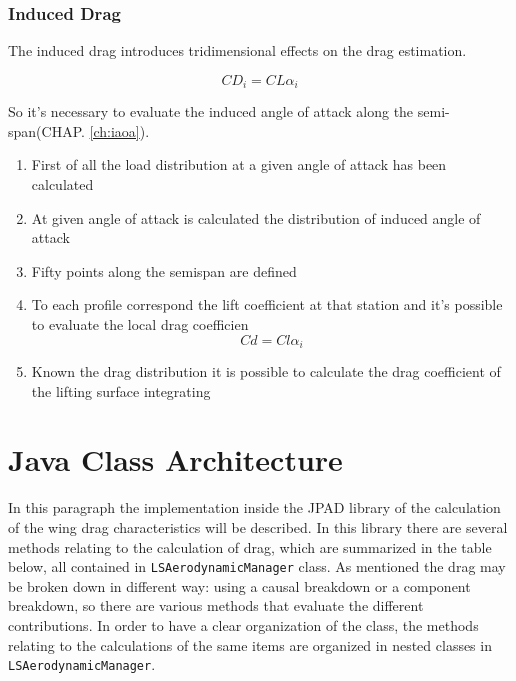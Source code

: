 \subsubsection{Induced Drag}

The induced drag introduces tridimensional effects on the drag estimation.

\begin{equation}
CD_i = CL \alpha_i
\end{equation}

So it's necessary to evaluate the induced angle of attack along the semi-span(CHAP. \ref{ch:iaoa}).
	
\begin{enumerate}
	\item First of all the load distribution at a given angle of attack has been calculated
	\item At given angle of attack is calculated the distribution of induced angle of attack
	\item Fifty points along the semispan are defined
	\item To each profile correspond the lift coefficient at that station and it's possible to evaluate the local drag coefficien
	\begin{equation}
	Cd =Cl \alpha_i
	\end{equation}
	\item Known the drag distribution it is possible to calculate the drag coefficient of the lifting surface integrating
\end{enumerate}



\section{Java Class Architecture}

In this paragraph the implementation inside the JPAD library of the calculation of the wing drag characteristics will be described. In this library there are several methods relating to the calculation of drag, which are summarized in the table below, all contained in \texttt{LSAerodynamicManager} class. As mentioned the drag may be broken down in different way: using a causal breakdown or a component breakdown, so there are various methods that evaluate the different contributions. In order to have a clear organization of the class, the methods relating to the calculations of the same items are organized in nested classes in  \texttt{LSAerodynamicManager}.\\ 

